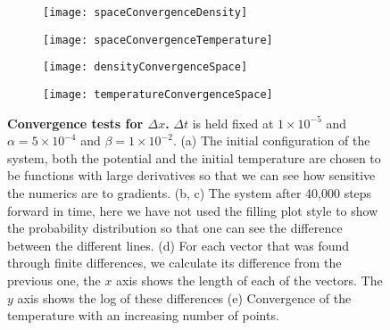 \begin{figure}

	\begin{subfigure}{0.49\textwidth}
		\texttt{[image: spaceConvergenceDensity]}
		\caption{}
	\end{subfigure}
	\begin{subfigure}{0.49\textwidth}
		\texttt{[image: spaceConvergenceTemperature]}
		\caption{}
	\end{subfigure}

	\begin{subfigure}{0.49\textwidth}
		\texttt{[image: densityConvergenceSpace]}
		\caption{}
	\end{subfigure}
	\begin{subfigure}{0.49\textwidth}
		\texttt{[image: temperatureConvergenceSpace]}
		\caption{}
	\end{subfigure}
\caption{\textbf{Convergence tests for $\Delta x$.} $\Delta t$ is held fixed at $1 \times 10^{-5}$ and $\alpha = 5 \times 10^{-4}$ and $\beta = 1 \times 10^{-2}$. (a) The initial configuration of the system, both the potential and the initial temperature are chosen to be functions with large derivatives so that we can see how sensitive the numerics are to gradients. (b, c) The system after 40,000 steps forward in time, here we have not used the filling plot style to show the probability distribution so that one can see the difference between the different lines. (d) For each vector that was found through finite differences, we calculate its difference from the previous one, the $x$ axis shows the length of each of the vectors. The $y$ axis shows the log of these differences (e) Convergence of the temperature with an increasing number of points. \label{fig:spaceConvergence}}
\end{figure}